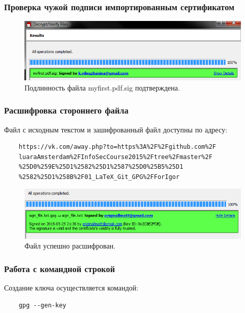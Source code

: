 \documentclass[a4paper, 14pt]{article}				%
\begin{document}
\subsubsection{Проверка чужой подписи импортированным сертификатом}
\begin{figure}[h!]
\centering
\includegraphics[width=\textwidth]{fig12}
\caption{Подлинность файла myfirst.pdf.sig подтверждена.}
\end{figure}

\subsubsection{Расшифровка стороннего файла}

Файл с исходным текстом и зашифрованный файл доступны по адресу:

\begin{verbatim}
	https://vk.com/away.php?to=https%3A%2F%2Fgithub.com%2F
	luaraAmsterdam%2FInfoSecCourse2015%2Ftree%2Fmaster%2F
	%25D0%259E%25D1%2582%25D1%2587%25D0%25B5%25D1
	%2582%25D1%258B%2F01_LaTeX_Git_GPG%2FForIgor
\end{verbatim}

\begin{figure}[h!]
\centering
\includegraphics[width=\textwidth]{fig15}
\caption{Файл успешно расшифрован.}
\end{figure}

\subsubsection{Работа с командной строкой}
Создание ключа осуществляется командой:
\begin{verbatim}
	gpg --gen-key
\end{verbatim}
\end{document}
